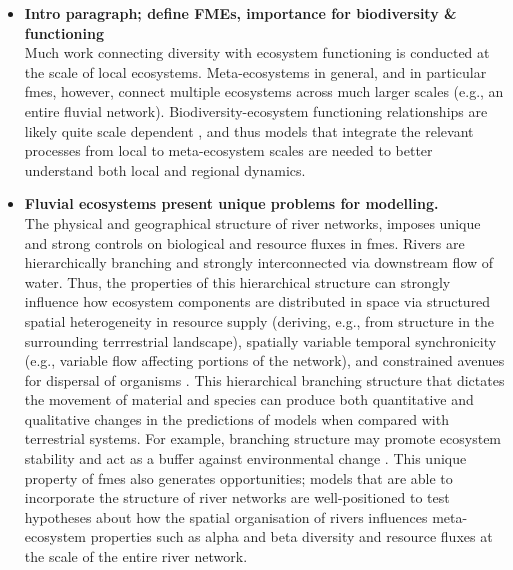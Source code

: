 \documentclass[11pt,a4paper]{article}
\newcommand{\fitem}[2]{\item {\bfseries #1} \\ #2}
\begin{document}
\begin{itemize}
	\fitem{Intro paragraph; define FMEs, importance for biodiversity \& functioning}
		{Much work connecting diversity with ecosystem functioning is conducted at the scale of local ecosystems.
		Meta-ecosystems in general, and in particular \acp{fme}, however, connect multiple ecosystems across much larger scales (e.g., an entire fluvial network).
		Biodiversity-ecosystem functioning relationships are likely quite scale dependent \autocite{Gonzalez2020}, and thus models that integrate the relevant processes from local to meta-ecosystem scales are needed to better understand both local and regional dynamics.}
	\fitem{Fluvial ecosystems present unique problems for modelling.}
		{The physical and geographical structure of river networks, imposes unique and strong controls on biological and resource fluxes in \acp{fme}.
		Rivers are hierarchically branching and strongly interconnected via downstream flow of water.
		Thus, the properties of this hierarchical structure can strongly influence how ecosystem components are distributed in space via structured spatial heterogeneity in resource supply (deriving, e.g., from structure in the surrounding terrrestrial landscape), spatially variable temporal synchronicity (e.g., variable flow affecting portions of the network), and constrained avenues for dispersal of organisms \autocite{Helton2018,BENDA2004,Heino2015}.
		This hierarchical branching structure that dictates the movement of material and species can produce both quantitative and qualitative changes in the predictions of models when compared with terrestrial systems. 
		For example, branching structure may promote ecosystem stability and act as a buffer against environmental change \autocite{Terui2018}.
		This unique property of \acp{fme} also generates opportunities; models that are able to incorporate the structure of river networks are well-positioned to test hypotheses about how the spatial organisation of rivers influences meta-ecosystem properties such as alpha and beta diversity and resource fluxes at the scale of the entire river network.}


\end{itemize}
\end{document}
